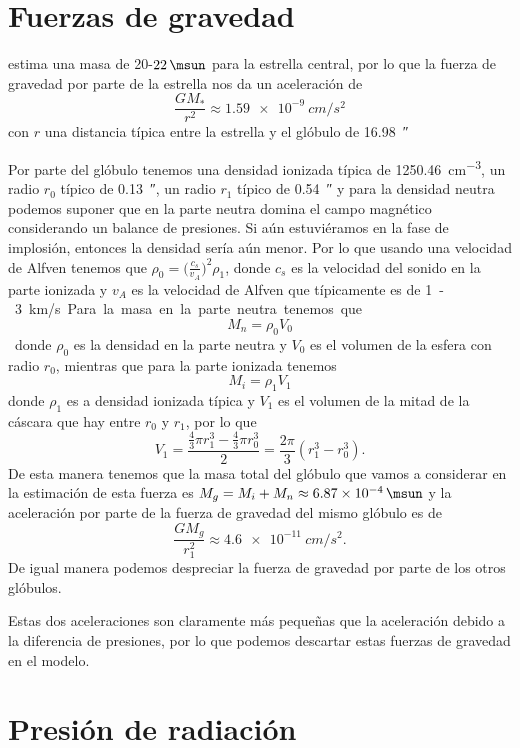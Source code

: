 \documentclass{book}
\begin{document}
\section{Fuerzas de gravedad} \label{F gravedad}

\cite{Hamann:2019} estima una masa  de 20-$\SI{22}{\msun}$ para la estrella central, por lo que la fuerza de gravedad por parte de la estrella nos da un aceleración de 
\[\frac{GM_*}{r^2}\approx \SI{1.59e-9}{cm/s^2}\] con $r$ una distancia típica entre la estrella y el glóbulo de \SI{16.98}{\arcsecond}

Por parte del glóbulo tenemos una densidad ionizada típica de \SI{1250.46}{cm^{-3}}, un radio $r_0$ típico de \SI{.13}{\arcsecond}, un radio $r_1$ típico de \SI{.54}{\arcsecond} y para la densidad neutra podemos suponer que en la parte neutra domina el campo magnético considerando un balance de presiones. Si aún estuviéramos en la fase de implosión, entonces la densidad sería aún menor. Por lo que usando una velocidad de Alfven tenemos que $\rho_0 = \Big(\frac{c_s}{v_A}\Big)^2\rho_1$, donde $c_s$ es la velocidad del sonido en la parte ionizada y $v_A$ es la velocidad de Alfven que típicamente es de \SI{1}-\SI{3}{km/s}. Para la masa en la parte neutra tenemos que \[M_n = \rho_0 V_0\]
donde $\rho_0$ es la densidad en la parte neutra y $V_0$ es el volumen de la esfera con radio $r_0$, mientras que para la parte ionizada tenemos \[M_i = \rho_1 V_1\] donde $\rho_1$ es a densidad ionizada típica  y $V_1$ es el volumen de la mitad de la cáscara que hay entre $r_0$ y $r_1$, por lo que \[V_1 = \frac{\frac{4}{3}\pi r_1^3-\frac{4}{3}\pi r_0^3}{2}=\frac{2\pi}{3}(r_1^3-r_0^3).\] De esta manera tenemos que la masa total del glóbulo que vamos a considerar en la estimación de esta fuerza es $M_g = M_i + M_n \approx \SI{6.87e-4}{\msun}$ y la aceleración por parte de la fuerza de gravedad del mismo glóbulo es de
\[\frac{G M_g}{r_1^2}\approx \SI{4.6e-11}{cm/s^2}.\] De igual manera podemos despreciar la fuerza de gravedad por parte de los otros glóbulos. 

Estas dos aceleraciones son claramente más pequeñas que la aceleración debido a la diferencia de presiones, por lo que podemos descartar estas fuerzas de gravedad en el modelo.

\section{Presión de radiación}
\end{document}
